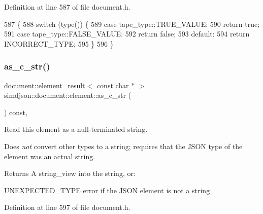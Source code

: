 Definition at line 587 of file document.\+h.


\begin{DoxyCode}
587                                                                             \{
588   \textcolor{keywordflow}{switch} (type()) \{
589     \textcolor{keywordflow}{case} tape\_type::TRUE\_VALUE:
590       \textcolor{keywordflow}{return} \textcolor{keyword}{true};
591     \textcolor{keywordflow}{case} tape\_type::FALSE\_VALUE:
592       \textcolor{keywordflow}{return} \textcolor{keyword}{false};
593     \textcolor{keywordflow}{default}:
594       \textcolor{keywordflow}{return} INCORRECT\_TYPE;
595   \}
596 \}
\end{DoxyCode}
\mbox{\label{classsimdjson_1_1document_1_1element_ae3df9bdbad4492c1c19b11c66c5e61be}} 
\subsubsection{\texorpdfstring{as\+\_\+c\+\_\+str()}{as\_c\_str()}}
{\footnotesize\ttfamily \hyperlink{classsimdjson_1_1document_1_1element__result}{document\+::element\+\_\+result}$<$ const char $\ast$ $>$ simdjson\+::document\+::element\+::as\+\_\+c\+\_\+str (\begin{DoxyParamCaption}{ }\end{DoxyParamCaption}) const\hspace{0.3cm}{\ttfamily [inline]}, {\ttfamily [noexcept]}}



Read this element as a null-\/terminated string. 

Does {\itshape not} convert other types to a string; requires that the J\+S\+ON type of the element was an actual string.

\begin{DoxyReturn}{Returns}
A {\ttfamily string\+\_\+view} into the string, or\+:
\begin{DoxyItemize}
\item U\+N\+E\+X\+P\+E\+C\+T\+E\+D\+\_\+\+T\+Y\+PE error if the J\+S\+ON element is not a string 
\end{DoxyItemize}
\end{DoxyReturn}


Definition at line 597 of file document.\+h.


